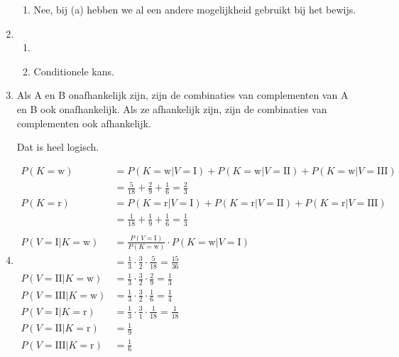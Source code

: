 \documentclass{article}
\begin{document}
\begin{enumerate}
\begin{enumerate}
            \item
                Nee, bij (a) hebben we al een andere mogelijkheid gebruikt bij
                het bewijs.

        \end{enumerate}

    \item
        \begin{enumerate}
            \item
            \item
                Conditionele kans.

        \end{enumerate}

    \item
        Als A en B onafhankelijk zijn, zijn de combinaties van complementen van
        A en B ook onafhankelijk. Als ze afhankelijk zijn, zijn de combinaties
        van complementen ook afhankelijk.

        Dat is heel logisch.

    \item
        \newcommand{\kw}{\mathrm{w}}
        \newcommand{\kr}{\mathrm{r}}
        \newcommand{\I}{\mathrm{I}}
        \newcommand{\II}{\mathrm{II}}
        \newcommand{\III}{\mathrm{III}}

        \begin{align*}
            P(K = \kw) &= P(K = \kw | V = \I) + P(K = \kw | V = \II) +
            P(K = \kw | V = \III) \\
            &= \frac5{18} + \frac29 + \frac16 = \frac23 \\
            P(K = \kr) &= P(K = \kr | V = \I) + P(K = \kr | V = \II) +
            P(K = \kr | V = \III) \\
            &= \frac1{18} + \frac19 + \frac16 = \frac13 \\ \\
            P(V = \I | K = \kw) &= \frac{P(V = \I)}{P(K = \kw)} \cdot
            P(K = \kw | V = \I) \\
            &= \frac13 \cdot \frac32 \cdot \frac5{18} = \frac{15}{36} \\
            P(V = \II | K = \kw) &= \frac13 \cdot \frac32 \cdot \frac29
            = \frac13 \\
            P(V = \III | K = \kw) &= \frac13 \cdot \frac32 \cdot \frac16
            = \frac14 \\
            P(V = \I | K = \kr) &= \frac13 \cdot \frac31 \cdot \frac1{18} =
            \frac1{18} \\
            P(V = \II | K = \kr) &= \frac19 \\
            P(V = \III | K = \kr) &= \frac16 \\
        \end{align*}

\end{enumerate}
\end{document}

